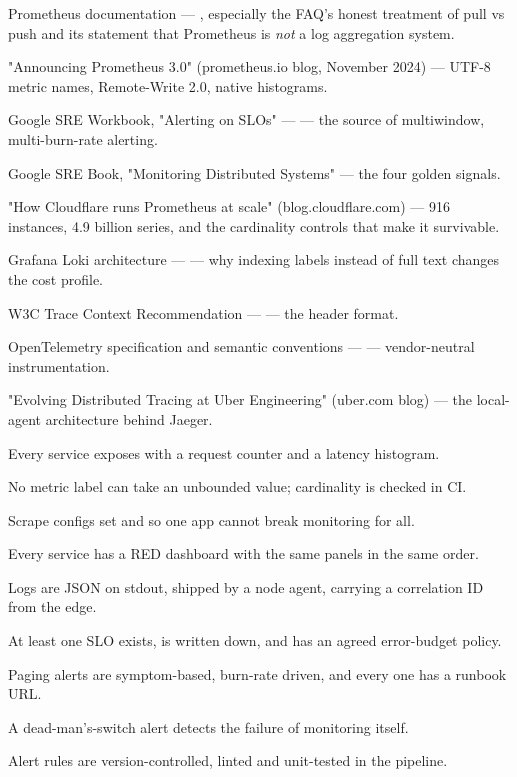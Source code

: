 \begin{wbitem}
  \item Prometheus documentation --- , especially the FAQ's honest treatment of pull vs push and its statement that Prometheus is \emph{not} a log aggregation system.
  \item "Announcing Prometheus 3.0" (prometheus.io blog, November 2024) --- UTF-8 metric names, Remote-Write 2.0, native histograms.
  \item Google SRE Workbook, "Alerting on SLOs" ---  --- the source of multiwindow, multi-burn-rate alerting.
  \item Google SRE Book, "Monitoring Distributed Systems" --- the four golden signals.
  \item "How Cloudflare runs Prometheus at scale" (blog.cloudflare.com) --- 916 instances, 4.9 billion series, and the cardinality controls that make it survivable.
  \item Grafana Loki architecture ---  --- why indexing labels instead of full text changes the cost profile.
  \item W3C Trace Context Recommendation ---  --- the  header format.
  \item OpenTelemetry specification and semantic conventions ---  --- vendor-neutral instrumentation.
  \item "Evolving Distributed Tracing at Uber Engineering" (uber.com blog) --- the local-agent architecture behind Jaeger.
\end{wbitem}

\begin{checklist}
  \item Every service exposes  with a request counter and a latency histogram.
  \item No metric label can take an unbounded value; cardinality is checked in CI.
  \item Scrape configs set  and  so one app cannot break monitoring for all.
  \item Every service has a RED dashboard with the same panels in the same order.
  \item Logs are JSON on stdout, shipped by a node agent, carrying a correlation ID from the edge.
  \item At least one SLO exists, is written down, and has an agreed error-budget policy.
  \item Paging alerts are symptom-based, burn-rate driven, and every one has a runbook URL.
  \item A dead-man's-switch alert detects the failure of monitoring itself.
  \item Alert rules are version-controlled, linted and unit-tested in the pipeline.
\end{checklist}

